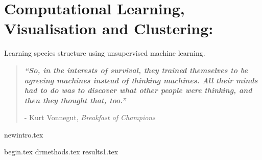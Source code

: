 

\chapter{ Computational Learning, Visualisation and Clustering:}
\vspace{-1cm} {\Large Learning species structure using unsupervised machine learning. } 


\blankpage
\restoregeometry
\vspace*{0.15\paperheight}


\begin{center}
\begin{quotation}
  \large{\emph{\textbf{``So, in the interests of survival, they trained themselves to be agreeing machines instead of thinking machines. All their minds had to do was to discover what other people were thinking, and then they thought that, too.''} }  }  \\
  \begin{flushright}
  - Kurt Vonnegut, \textit{Breakfast of Champions} 
  \end{flushright}
 \end{quotation}
\end{center}
\doublespacing
\newpage

%
{newintro.tex}

% 
 {begin.tex}
 {drmethods.tex}
{results1.tex}
% 
% 



\chapterbib






